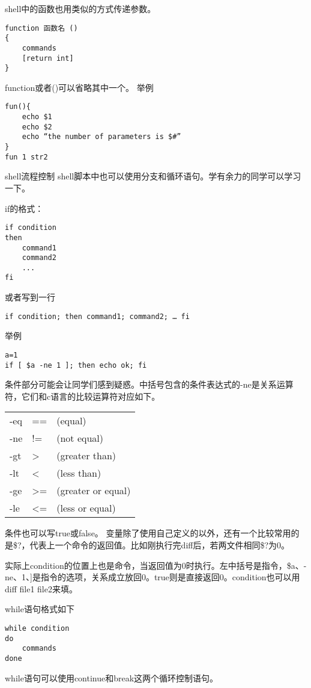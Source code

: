 shell中的函数也用类似的方式传递参数。
\begin{verbatim}
function 函数名 ()
{
    commands
    [return int]
}
\end{verbatim}
function或者()可以省略其中一个。
举例
\begin{verbatim}
fun(){
    echo $1
    echo $2
    echo “the number of parameters is $#”
}
fun 1 str2
\end{verbatim}

shell流程控制
shell脚本中也可以使用分支和循环语句。学有余力的同学可以学习一下。

if的格式：
\begin{verbatim}
if condition
then
    command1
    command2
    ...
fi
\end{verbatim}

或者写到一行
\begin{verbatim}
if condition; then command1; command2; … fi
\end{verbatim}

举例
\begin{verbatim}
a=1
if [ $a -ne 1 ]; then echo ok; fi
\end{verbatim}

条件部分可能会让同学们感到疑惑。中括号包含的条件表达式的-ne是关系运算符，它们和c语言的比较运算符对应如下。

\begin{tabular}{lll}
-eq  &==  &(equal)  \\
-ne  &!=  &(not equal) \\
-gt  &>   &(greater than) \\
-lt  &<   &(less than) \\
-ge  &>=  &(greater or equal)\\
-le  &<=  &(less or equal)
\end{tabular}

条件也可以写true或false。
变量除了使用自己定义的以外，还有一个比较常用的是\$?，代表上一个命令的返回值。比如刚执行完diff后，若两文件相同\$?为0。

实际上condition的位置上也是命令，当返回值为0时执行。左中括号是指令，\$a、-ne、1、]是指令的选项，关系成立放回0。true则是直接返回0。condition也可以用diff file1 file2来填。

while语句格式如下
\begin{verbatim}
while condition
do
    commands
done
\end{verbatim}
while语句可以使用continue和break这两个循环控制语句。

